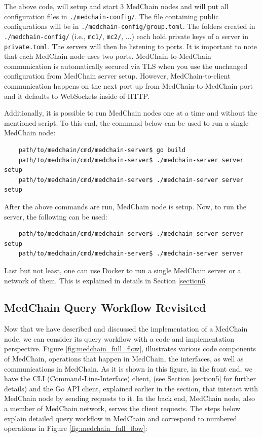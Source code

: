 The above code, will setup and start 3 MedChain nodes and will put all configuration files in \texttt{./medchain-config/}. The file containing public configurations will be in \texttt{./medchain-config/group.toml}. The folders created in \texttt{./medchain-config/} (i.e., \texttt{mc1/}, \texttt{mc2/}, ...) each hold private keys of a server in \texttt{private.toml}. The servers will then be listening to ports. It is important to note that each MedChain node uses two ports. MedChain-to-MedChain communication is automatically secured via TLS when you use the unchanged configuration from MedChain server setup. However, MedChain-to-client communication happens on the next port up from MedChain-to-MedChain port and it defaults to WebSockets inside of HTTP.

Additionally, it is possible to run MedChain nodes one at a time and without the mentioned script. To this end, the command below can be used to run a single MedChain node:
\begin{verbatim}
    path/to/medchain/cmd/medchain-server$ go build
    path/to/medchain/cmd/medchain-server$ ./medchain-server server setup
    path/to/medchain/cmd/medchain-server$ ./medchain-server server setup
\end{verbatim}

After the above commands are run, MedChain node is setup. Now, to run the server, the following can be used:
\begin{verbatim}
    path/to/medchain/cmd/medchain-server$ ./medchain-server server setup
    path/to/medchain/cmd/medchain-server$ ./medchain-server server
\end{verbatim}


Last but not least, one can use Docker to run a single MedChain server or a network of them. This is explained in details in Section \ref{section6}.  

\subsection{MedChain Query Workflow Revisited} \label{workflow-revisited}
Now that we have described and discussed the implementation of a MedChain node, we can consider its query workflow with a code and implementation perspective. 
Figure \ref{fig:medchain_full_flow}, illustrates various code components of MedChain, operations that happen in MedChain, the interfaces, as well as communications in MedChain. As it is shown in this figure, in the front end, we have the CLI (Command-Line-Interface) client, (see Section \ref{section5} for further details) and the Go API client, explained earlier in the section, that interact with MedChain node by sending requests to it. In the back end, MedChain node, also a member of MedChain network, serves the client requests. The steps below explain detailed query workflow in MedChain and correspond to numbered operations in Figure \ref{fig:medchain_full_flow}:


